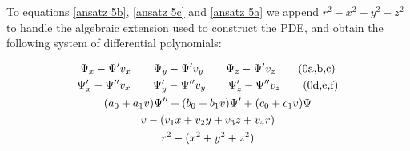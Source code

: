 \documentclass{article}
\theoremstyle{definition}
\theoremstyle{plain}
\begin{document}
To equations \eqref{ansatz 5b}, \eqref{ansatz 5c} and \eqref{ansatz 5a} we append
$r^2-x^2-y^2-z^2$ to handle the algebraic extension used to construct the PDE, and obtain
the following system of differential polynomials:

\begin{subequations}
\label{ansatz 5 plus}
\begin{gather}
\Psi_x - \Psi' v_x \qquad
\Psi_y - \Psi' v_y \qquad
\Psi_z - \Psi' v_z \stepcounter{equation}\stepcounter{equation}\stepcounter{equation}\tag{\arabic{parentequation}a,b,c} \\
\Psi'_x - \Psi'' v_x \qquad
\Psi'_y - \Psi'' v_y \qquad
\Psi'_z - \Psi'' v_z \stepcounter{equation}\stepcounter{equation}\stepcounter{equation}\tag{\arabic{parentequation}d,e,f} \\
(a_0 + a_1 v) \Psi'' + (b_0 + b_1 v) \Psi' + (c_0 + c_1 v) \Psi \label{ansatz 5 plus:1} \\
v - (v_1 x + v_2 y + v_3 z + v_4 r) \label{ansatz 5 plus:2} \\
r^2 - (x^2 + y^2 + z^2)
\end{gather}
\end{subequations}

\end{document}
